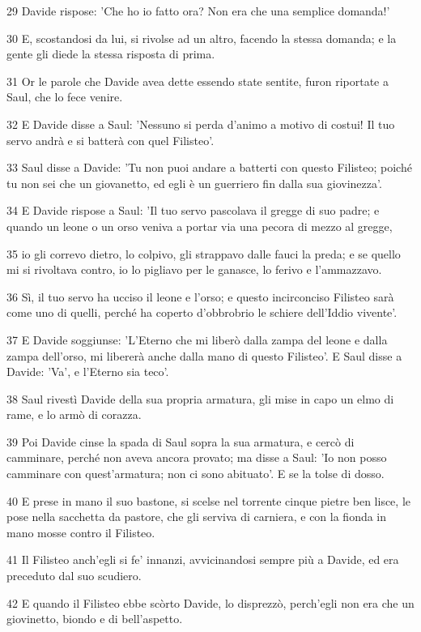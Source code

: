 \par 29 Davide rispose: 'Che ho io fatto ora? Non era che una semplice domanda!'
\par 30 E, scostandosi da lui, si rivolse ad un altro, facendo la stessa domanda; e la gente gli diede la stessa risposta di prima.
\par 31 Or le parole che Davide avea dette essendo state sentite, furon riportate a Saul, che lo fece venire.
\par 32 E Davide disse a Saul: 'Nessuno si perda d'animo a motivo di costui! Il tuo servo andrà e si batterà con quel Filisteo'.
\par 33 Saul disse a Davide: 'Tu non puoi andare a batterti con questo Filisteo; poiché tu non sei che un giovanetto, ed egli è un guerriero fin dalla sua giovinezza'.
\par 34 E Davide rispose a Saul: 'Il tuo servo pascolava il gregge di suo padre; e quando un leone o un orso veniva a portar via una pecora di mezzo al gregge,
\par 35 io gli correvo dietro, lo colpivo, gli strappavo dalle fauci la preda; e se quello mi si rivoltava contro, io lo pigliavo per le ganasce, lo ferivo e l'ammazzavo.
\par 36 Sì, il tuo servo ha ucciso il leone e l'orso; e questo incirconciso Filisteo sarà come uno di quelli, perché ha coperto d'obbrobrio le schiere dell'Iddio vivente'.
\par 37 E Davide soggiunse: 'L'Eterno che mi liberò dalla zampa del leone e dalla zampa dell'orso, mi libererà anche dalla mano di questo Filisteo'. E Saul disse a Davide: 'Va', e l'Eterno sia teco'.
\par 38 Saul rivestì Davide della sua propria armatura, gli mise in capo un elmo di rame, e lo armò di corazza.
\par 39 Poi Davide cinse la spada di Saul sopra la sua armatura, e cercò di camminare, perché non aveva ancora provato; ma disse a Saul: 'Io non posso camminare con quest'armatura; non ci sono abituato'. E se la tolse di dosso.
\par 40 E prese in mano il suo bastone, si scelse nel torrente cinque pietre ben lisce, le pose nella sacchetta da pastore, che gli serviva di carniera, e con la fionda in mano mosse contro il Filisteo.
\par 41 Il Filisteo anch'egli si fe' innanzi, avvicinandosi sempre più a Davide, ed era preceduto dal suo scudiero.
\par 42 E quando il Filisteo ebbe scòrto Davide, lo disprezzò, perch'egli non era che un giovinetto, biondo e di bell'aspetto.
